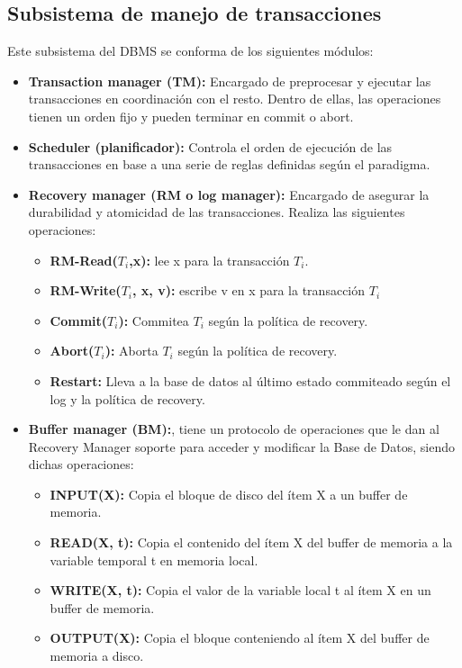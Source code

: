 \subsection*{Subsistema de manejo de transacciones}
Este subsistema del DBMS se conforma de los siguientes módulos:
\begin{itemize}
    \item \textbf{Transaction manager (TM):} Encargado de preprocesar y ejecutar las transacciones en coordinación con el resto. Dentro de ellas, las operaciones tienen un orden fijo y pueden terminar en commit o abort.
    \item \textbf{Scheduler (planificador):} Controla el orden de ejecución de las transacciones en base a una serie de reglas definidas según el paradigma.
    \item \textbf{Recovery manager (RM o log manager):} Encargado de asegurar la durabilidad y atomicidad de las transacciones. Realiza las siguientes operaciones:
    \begin{itemize}
        \item \textbf{RM-Read($T_i$,x):} lee x para la transacción $T_i$.
        \item \textbf{RM-Write($T_i$, x, v):} escribe v en x para la transacción $T_i$
        \item \textbf{Commit($T_i$):} Commitea $T_i$ según la política de recovery.
        \item \textbf{Abort($T_i$):} Aborta $T_i$ según la política de recovery.
        \item \textbf{Restart:} Lleva a la base de datos al último estado commiteado según el log y la política de recovery.
    \end{itemize}
    \item \textbf{Buffer manager (BM):}, tiene un protocolo de operaciones que le dan al Recovery Manager soporte para acceder y modificar la Base de Datos, siendo dichas operaciones:
    \begin{itemize}
        \item \textbf{INPUT(X):} Copia el bloque de disco del ítem X a un buffer de memoria.
        \item \textbf{READ(X, t):} Copia el contenido del ítem X del buffer de memoria a la variable temporal t en memoria local.
        \item \textbf{WRITE(X, t):} Copia el valor de la variable local t al ítem X en un buffer de memoria.
        \item \textbf{OUTPUT(X):} Copia el bloque conteniendo al ítem X del buffer de memoria a disco.

\end{itemize}
\end{itemize}
